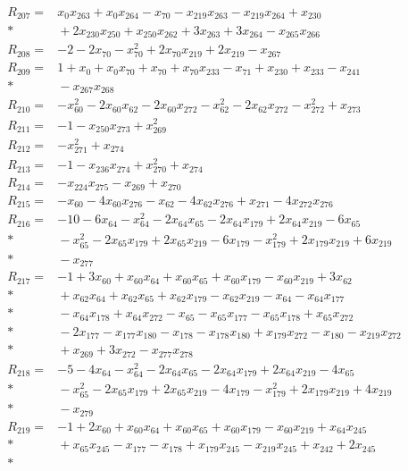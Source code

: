 \begin{align*}
R_{207}={}&x_{0}x_{263}+x_{0}x_{264}-x_{70}-x_{219}x_{263}-x_{219}x_{264}+x_{230}\\*
&{}+2x_{230}x_{250}+x_{250}x_{262}+3x_{263}+3x_{264}-x_{265}x_{266}\\[3pt]
R_{208}={}&-2-2x_{70}-x_{70}^{2}+2x_{70}x_{219}+2x_{219}-x_{267}\\[3pt]
R_{209}={}&1+x_{0}+x_{0}x_{70}+x_{70}+x_{70}x_{233}-x_{71}+x_{230}+x_{233}-x_{241}\\*
&{}-x_{267}x_{268}\\[3pt]
R_{210}={}&-x_{60}^{2}-2x_{60}x_{62}-2x_{60}x_{272}-x_{62}^{2}-2x_{62}x_{272}-x_{272}^{2}+x_{273}\\[3pt]
R_{211}={}&-1-x_{250}x_{273}+x_{269}^{2}\\[3pt]
R_{212}={}&-x_{271}^{2}+x_{274}\\[3pt]
R_{213}={}&-1-x_{236}x_{274}+x_{270}^{2}+x_{274}\\[3pt]
R_{214}={}&-x_{224}x_{275}-x_{269}+x_{270}\\[3pt]
R_{215}={}&-x_{60}-4x_{60}x_{276}-x_{62}-4x_{62}x_{276}+x_{271}-4x_{272}x_{276}\\[3pt]
R_{216}={}&-10-6x_{64}-x_{64}^{2}-2x_{64}x_{65}-2x_{64}x_{179}+2x_{64}x_{219}-6x_{65}\\*
&{}-x_{65}^{2}-2x_{65}x_{179}+2x_{65}x_{219}-6x_{179}-x_{179}^{2}+2x_{179}x_{219}+6x_{219}\\*
&{}-x_{277}\\[3pt]
R_{217}={}&-1+3x_{60}+x_{60}x_{64}+x_{60}x_{65}+x_{60}x_{179}-x_{60}x_{219}+3x_{62}\\*
&{}+x_{62}x_{64}+x_{62}x_{65}+x_{62}x_{179}-x_{62}x_{219}-x_{64}-x_{64}x_{177}\\*
&{}-x_{64}x_{178}+x_{64}x_{272}-x_{65}-x_{65}x_{177}-x_{65}x_{178}+x_{65}x_{272}\\*
&{}-2x_{177}-x_{177}x_{180}-x_{178}-x_{178}x_{180}+x_{179}x_{272}-x_{180}-x_{219}x_{272}\\*
&{}+x_{269}+3x_{272}-x_{277}x_{278}\\[3pt]
R_{218}={}&-5-4x_{64}-x_{64}^{2}-2x_{64}x_{65}-2x_{64}x_{179}+2x_{64}x_{219}-4x_{65}\\*
&{}-x_{65}^{2}-2x_{65}x_{179}+2x_{65}x_{219}-4x_{179}-x_{179}^{2}+2x_{179}x_{219}+4x_{219}\\*
&{}-x_{279}\\[3pt]
R_{219}={}&-1+2x_{60}+x_{60}x_{64}+x_{60}x_{65}+x_{60}x_{179}-x_{60}x_{219}+x_{64}x_{245}\\*
&{}+x_{65}x_{245}-x_{177}-x_{178}+x_{179}x_{245}-x_{219}x_{245}+x_{242}+2x_{245}\\*

\end{align*}
